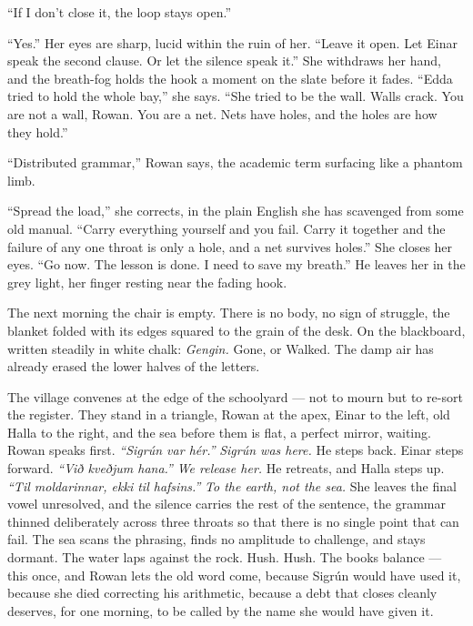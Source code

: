 \documentclass[11pt,oneside]{book}
\newcommand{\sceneline}{%
  \par\vspace{1.2em}
  \begin{center}
    \fontsize{11}{11}\selectfont \textbullet\quad\textbullet\quad\textbullet
  \end{center}
  \vspace{0.6em}\noindent\ignorespaces
}
\begin{document}
``If I don't close it, the loop stays open.''

``Yes.'' Her eyes are sharp, lucid within the ruin of her. ``Leave it
open. Let Einar speak the second clause. Or let the silence speak it.''
She withdraws her hand, and the breath-fog holds the hook a moment on
the slate before it fades. ``Edda tried to hold the whole bay,'' she
says. ``She tried to be the wall. Walls crack. You are not a wall,
Rowan. You are a net. Nets have holes, and the holes are how they
hold.''

``Distributed grammar,'' Rowan says, the academic term surfacing like a
phantom limb.

``Spread the load,'' she corrects, in the plain English she has
scavenged from some old manual. ``Carry everything yourself and you
fail. Carry it together and the failure of any one throat is only a
hole, and a net survives holes.'' She closes her eyes. ``Go now. The
lesson is done. I need to save my breath.'' He leaves her in the grey
light, her finger resting near the fading hook.

The next morning the chair is empty. There is no body, no sign of
struggle, the blanket folded with its edges squared to the grain of the
desk. On the blackboard, written steadily in white chalk: \emph{Gengin.}
Gone, or Walked. The damp air has already erased the lower halves of the
letters.

The village convenes at the edge of the schoolyard --- not to mourn but
to re-sort the register. They stand in a triangle, Rowan at the apex,
Einar to the left, old Halla to the right, and the sea before them is
flat, a perfect mirror, waiting. Rowan speaks first. \emph{``Sigrún var
hér.''} \emph{Sigrún was here.} He steps back. Einar steps forward.
\emph{``Við kveðjum hana.''} \emph{We release her.} He retreats, and
Halla steps up. \emph{``Til moldarinnar, ekki til hafsins.''} \emph{To
the earth, not the sea.} She leaves the final vowel unresolved, and the
silence carries the rest of the sentence, the grammar thinned
deliberately across three throats so that there is no single point that
can fail. The sea scans the phrasing, finds no amplitude to challenge,
and stays dormant. The water laps against the rock. Hush. Hush. The
books balance --- this once, and Rowan lets the old word come, because
Sigrún would have used it, because she died correcting his arithmetic,
because a debt that closes cleanly deserves, for one morning, to be
called by the name she would have given it.

\sceneline
\end{document}
